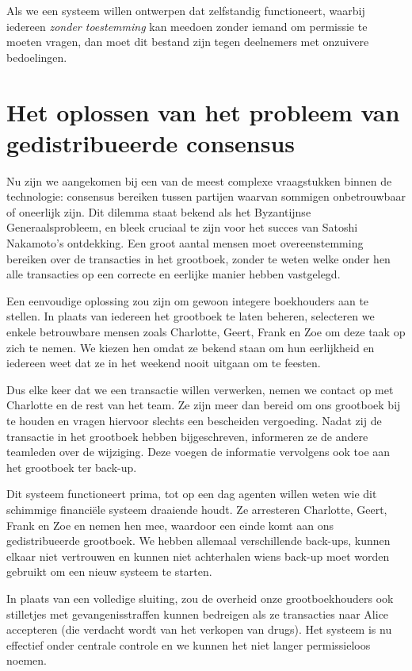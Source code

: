 Als we een systeem willen ontwerpen dat zelfstandig functioneert, waarbij iedereen \textit{zonder toestemming} kan meedoen zonder iemand om permissie te moeten vragen, dan moet dit bestand zijn tegen deelnemers met onzuivere bedoelingen.

\section{Het oplossen van het probleem van gedistribueerde consensus}

Nu zijn we aangekomen bij een van de meest complexe vraagstukken binnen de technologie: consensus bereiken tussen partijen waarvan sommigen onbetrouwbaar of oneerlijk zijn. Dit dilemma staat bekend als het Byzantijnse Generaalsprobleem, en bleek cruciaal te zijn voor het succes van Satoshi Nakamoto's ontdekking. Een groot aantal mensen moet overeenstemming bereiken over de transacties in het grootboek, zonder te weten welke onder hen alle transacties op een correcte en eerlijke manier hebben vastgelegd.

Een eenvoudige oplossing zou zijn om gewoon integere boekhouders aan te stellen. In plaats van iedereen het grootboek te laten beheren, selecteren we enkele betrouwbare mensen zoals Charlotte, Geert, Frank en Zoe om deze taak op zich te nemen. We kiezen hen omdat ze bekend staan om hun eerlijkheid en iedereen weet dat ze in het weekend nooit uitgaan om te feesten.

Dus elke keer dat we een transactie willen verwerken, nemen we contact op met Charlotte en de rest van het team. Ze zijn meer dan bereid om ons grootboek bij te houden en vragen hiervoor slechts een bescheiden vergoeding. Nadat zij de transactie in het grootboek hebben bijgeschreven, informeren ze de andere teamleden over de wijziging. Deze voegen de informatie vervolgens ook toe aan het grootboek ter back-up.

Dit systeem functioneert prima, tot op een dag agenten willen weten wie dit schimmige financiële systeem draaiende houdt. Ze arresteren Charlotte, Geert, Frank en Zoe en nemen hen mee, waardoor een einde komt aan ons gedistribueerde grootboek. We hebben allemaal verschillende back-ups, kunnen elkaar niet vertrouwen en kunnen niet achterhalen wiens back-up moet worden gebruikt om een nieuw systeem te starten.

In plaats van een volledige sluiting, zou de overheid onze grootboekhouders ook stilletjes met gevangenisstraffen kunnen bedreigen als ze transacties naar Alice accepteren (die verdacht wordt van het verkopen van drugs). Het systeem is nu effectief onder centrale controle en we kunnen het niet langer permissieloos noemen. 

